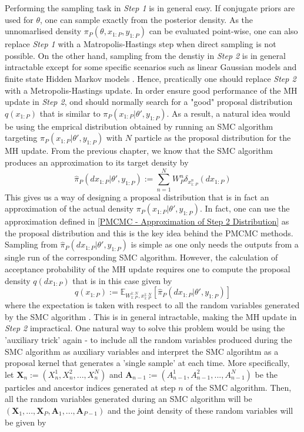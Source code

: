 \documentclass[12pt,a4paper]{article}
\begin{document}
Performing the sampling task in \textit{Step 1} is in general easy. If conjugate priors are used for $\theta$, one can sample exactly from the posterior density. As the unnomarlised density $\pi_P(\theta,x_{1:P},y_{1:P})$ can be evaluated point-wise, one can also replace \textit{Step 1} with a Matropolis-Hastings step when direct sampling is not possible. On the other hand, sampling from the denstiy in \textit{Step 2} is in general intractable except for some specific scenarios such as linear Gaussian models and finite state Hidden Markov models \citep{andrieu2010particle}. Hence, prcatically one should replace \textit{Step 2} with a Metropolis-Hastings update. In order ensure good performance of the MH update in \textit{Step 2}, ond should normally search for a "good" proposal distribution $q(x_{1:P})$ that is similar to $\pi_P(x_{1:P}|\theta',y_{1:P})$. As a result, a natural idea would be using the emprical distribution obtained by running an SMC algorithm targeting $\pi_P(x_{1:P}|\theta',y_{1:P})$ with $N$ particle as the proposal distribution for the MH update. From the previous chapter, we know that the SMC algorithm produces an approximation to its target density by
\begin{equation}
    \label{PMCMC - Approximation of Step 2 Distribution}
    \hat{\pi}_P(dx_{1:P}|\theta',y_{1:P}):=\sum_{n=1}^{N} W_P^n \delta_{x_{1:P}^n}(dx_{1:P})
\end{equation}
This gives us a way of designing a proposal distribution that is in fact an approximation of the actual density $\pi_P(x_{1:P}|\theta',y_{1:P})$. In fact, one can use the approximation defined in \eqref{PMCMC - Approximation of Step 2 Distribution} as the proposal distribution and this is the key idea behind the PMCMC methods. Sampling from $\hat{\pi}_P(dx_{1:P}|\theta',y_{1:P})$ is simple as one only needs the outputs from a single run of the corresponding SMC algorithm. However, the calculation of acceptance probability of the MH update requires one to compute the proposal density $q(dx_{1:P})$ that is in this case given by 
\begin{equation}
    q(x_{1:P}) := \mathbb{E}_{W_{1:P}^{1:N},x_{1:P}^{1:N}}\left[\hat{\pi}_P(dx_{1:P}|\theta',y_{1:P})\right]
\end{equation}
where the expectation is taken with respect to all the random variables generated by the SMC algorithm \citep{andrieu2010particle}. This is in general intractable, making the MH update in \textit{Step 2} impractical. One natural way to solve this problem would be using the 'auxiliary trick' again - to include all the random variables produced during the SMC algorithm as auxiliary variables and interpret the SMC algorihtm as a proposal kernel that generates a 'single sample' at each time. More specifically, let $\mathbf{X}_n := \left(X_n^1,X_n^2,...,X_n^N\right)$ and $\mathbf{A}_{n-1}:=\left(A_{n-1}^1,A_{n-1}^2,...,A_{n-1}^N\right)$ be the particles and ancestor indices generated at step $n$ of the SMC algorithm. Then, all the random variables generated during an SMC algorithm will be $\left(\mathbf{X}_1,...,\mathbf{X}_P,\mathbf{A}_1,...,\mathbf{A}_{P-1}\right)$ and the joint density of these random variables will be given by 
\end{document}
